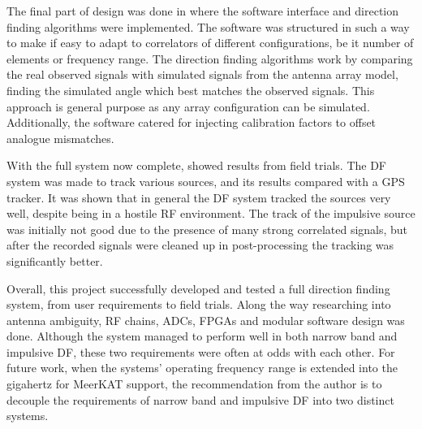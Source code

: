 The final part of design was done in  where the software interface and direction finding algorithms were implemented. The software was structured in such a way to make if easy to adapt to correlators of different configurations, be it number of elements or frequency range. The direction finding algorithms work by comparing the real observed signals with simulated signals from the antenna array model, finding the simulated angle which best matches the observed signals. This approach is general purpose as any array configuration can be simulated. Additionally, the software catered for injecting calibration factors to offset analogue mismatches.

With the full system now complete,  showed results from field trials. The DF system was made to track various sources, and its results compared with a GPS tracker. It was shown that in general the DF system tracked the sources very well, despite being in a hostile RF environment. The track of the impulsive source was initially not good due to the presence of many strong correlated signals, but after the recorded signals were cleaned up in post-processing the tracking was significantly better.

Overall, this project successfully developed and tested a full direction finding system, from user requirements to field trials. Along the way researching into antenna ambiguity, RF chains, ADCs, FPGAs and modular software design was done. Although the system managed to perform well in both narrow band and impulsive DF, these two requirements were often at odds with each other. For future work, when the systems' operating frequency range is extended into the gigahertz for MeerKAT support, the recommendation from the author is to decouple the requirements of narrow band and impulsive DF into two distinct systems.

